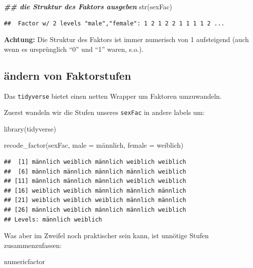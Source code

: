 \documentclass[
]{book}
\newenvironment{Shaded}{\begin{snugshade}}{\end{snugshade}}
\newcommand{\AttributeTok}[1]{\textcolor[rgb]{0.77,0.63,0.00}{#1}}
\newcommand{\DocumentationTok}[1]{\textcolor[rgb]{0.56,0.35,0.01}{\textbf{\textit{#1}}}}
\newcommand{\FunctionTok}[1]{\textcolor[rgb]{0.00,0.00,0.00}{#1}}
\newcommand{\NormalTok}[1]{#1}
\newcommand{\StringTok}[1]{\textcolor[rgb]{0.31,0.60,0.02}{#1}}
\begin{document}
\begin{Shaded}
\begin{Highlighting}[]
\DocumentationTok{\#\# die Struktur des Faktors ausgeben}
\FunctionTok{str}\NormalTok{(sexFac)  }
\end{Highlighting}
\end{Shaded}

\begin{verbatim}
##  Factor w/ 2 levels "male","female": 1 2 1 2 2 1 1 1 1 2 ...
\end{verbatim}

\textbf{Achtung:} Die Struktur des Faktors ist immer numerisch von 1 aufsteigend (auch wenn es ursprünglich ``0'' und ``1'' waren, s.o.).

\hypertarget{uxe4ndern-von-faktorstufen}{%
\subsection{ändern von Faktorstufen}\label{uxe4ndern-von-faktorstufen}}

Das \texttt{tidyverse} bietet einen netten Wrapper um Faktoren umzuwandeln.

Zuerst wandeln wir die Stufen unseres \texttt{sexFac} in andere labels um:

\begin{Shaded}
\begin{Highlighting}[]
\FunctionTok{library}\NormalTok{(tidyverse)}

\FunctionTok{recode\_factor}\NormalTok{(sexFac,}
              \AttributeTok{male =} \StringTok{\textquotesingle{}männlich\textquotesingle{}}\NormalTok{,}
              \AttributeTok{female =} \StringTok{\textquotesingle{}weiblich\textquotesingle{}}\NormalTok{)}
\end{Highlighting}
\end{Shaded}

\begin{verbatim}
##  [1] männlich weiblich männlich weiblich weiblich
##  [6] männlich männlich männlich männlich weiblich
## [11] männlich männlich männlich weiblich weiblich
## [16] weiblich weiblich männlich männlich männlich
## [21] weiblich weiblich weiblich männlich männlich
## [26] männlich weiblich männlich männlich weiblich
## Levels: männlich weiblich
\end{verbatim}

Was aber im Zweifel noch praktischer sein kann, ist unnötige Stufen zusammenzufassen:

\begin{Shaded}
\begin{Highlighting}[]
\NormalTok{numericfactor}
\end{Highlighting}
\end{Shaded}
\end{document}
